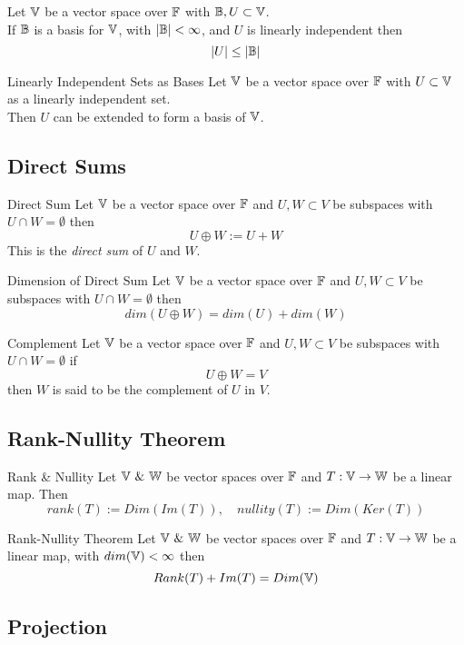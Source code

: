 \documentclass[11pt,a4paper]{article}
\begin{document}
\subtitle{Theorem 7.14}{}
Let $\mathbb{V}$ be a vector space over $\mathbb{F}$ with $\mathbb{B}, U \subset \mathbb{V}$.\\
If $\mathbb{B}$ is a basis for $\mathbb{V}$, with $|\mathbb{B}| < \infty$, and $U$ is linearly independent then $$|U| \leq |\mathbb{B}|$$

\subtitle{Theorem 7.15 - }{Linearly Independent Sets as Bases}
Let $\mathbb{V}$ be a vector space over $\mathbb{F}$ with $U \subset \mathbb{V}$ as a linearly independent set.\\
Then $U$ can be extended to form a basis of $\mathbb{V}$.

\subsection{Direct Sums}

\subtitle{Definition 7.16 - }{Direct Sum}
Let $\mathbb{V}$ be a vector space over $\mathbb{F}$ and $U, W \subset V$ be subspaces with $U \cap W = \emptyset$ then
$$U \oplus W := U + W$$
This is the \textit{direct sum} of $U$ and $W$.\\

\subtitle{Theorem 7.17 - }{Dimension of Direct Sum}
Let $\mathbb{V}$ be a vector space over $\mathbb{F}$ and $U, W \subset V$ be subspaces with $U \cap W = \emptyset$ then
$$dim(U \oplus W) = dim(U) + dim(W)$$

\subtitle{Theorem 7.18 - }{Complement}
Let $\mathbb{V}$ be a vector space over $\mathbb{F}$ and $U, W \subset V$ be subspaces with $U \cap W = \emptyset$ if
$$U \oplus W = V$$
then $W$ is said to be the complement of $U$ in $V$.

\subsection{Rank-Nullity Theorem}

\subtitle{Definition 7.19 - }{Rank \& Nullity}
Let $\mathbb{V}\ \&\ \mathbb{W}$ be vector spaces over $\mathbb{F}$ and $T : \mathbb{V} \to \mathbb{W}$ be a linear map. Then
$$rank(T) := Dim(Im(T)),\quad nullity(T) := Dim(Ker(T))$$

\subtitle{Theorem 7.20 - }{Rank-Nullity Theorem}
Let $\mathbb{V}\ \&\ \mathbb{W}$ be vector spaces over $\mathbb{F}$ and $T : \mathbb{V} \to \mathbb{W}$ be a linear map, with $dim(\mathbb{V}) < \infty$ then
$$Rank(T) + Im(T) = Dim(\mathbb{V})$$

\subsection{Projection}
\end{document}
